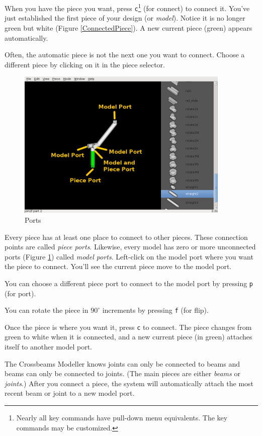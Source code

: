 \documentclass[12pt]{report}
\begin{document}
When you have the piece you want, press {\tt c}\footnote{Nearly all
  key commands have pull-down menu equivalents.  The key commands may
  be customized.} (for connect) to connect it.  You've just
established the first piece of your design (or \emph{model}).  Notice
it is no longer green but white (Figure \ref{ConnectedPiece}).  A new
current piece (green) appears automatically.

Often, the automatic piece is not the next one you want to connect.
Choose a different piece by clicking on it in the piece selector.

\begin{figure}[h]
\begin{center}
\includegraphics[width=4.0in]{doc_images/manual_ports.png}
\caption{Ports}
\label{Ports}
\end{center}
\end{figure}

Every piece has at least one place to connect to other pieces.  These
connection points are called \emph{piece ports}.  Likewise, every
model has zero or more unconnected ports (Figure \ref{Ports}) called
\emph{model ports}.  Left-click on the model port where you want the
piece to connect.  You'll see the current piece move to the model
port.

You can choose a different piece port to connect to the model port by
pressing {\tt p} (for port).

You can rotate the piece in $90 ^\circ$ increments by pressing {\tt f}
(for flip).

Once the piece is where you want it, press {\tt c} to connect.  The
piece changes from green to white when it is connected, and a new
current piece (in green) attaches itself to another model port.

The Crossbeams Modeller knows joints can only be connected to beams
and beams can only be connected to joints.  (The main pieces are
either \emph{beams} or \emph{joints}.)  After you connect a piece, the
system will automatically attach the most recent beam or joint to a
new model port.
\end{document}

